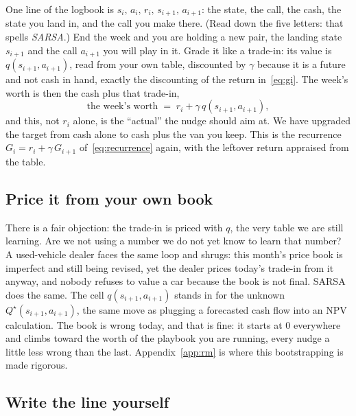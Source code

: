 \documentclass[11pt,a4paper]{article}
\theoremstyle{definition}
\theoremstyle{remark}
\numberwithin{equation}{section}
\begin{document}
One line of the logbook is $s_i,\, a_i,\, r_i,\, s_{i+1},\, a_{i+1}$: the state, the call, the
cash, the state you land in, and the call you make there. (Read down the five letters: that
spells \emph{SARSA}.) End the week and you are holding a new pair, the landing state
$s_{i+1}$ and the call $a_{i+1}$ you will play in it. Grade it like a trade-in: its value is
$q(s_{i+1}, a_{i+1})$, read from your own table, discounted by $\gamma$ because it is a future
and not cash in hand, exactly the discounting of the return in~\eqref{eq:gi}. The week's worth
is then the cash plus that trade-in,
\[
\text{the week's worth} \;=\; r_i + \gamma\, q(s_{i+1}, a_{i+1}),
\]
and this, not $r_i$ alone, is the ``actual'' the nudge should aim at. We have upgraded the
target from cash alone to cash plus the van you keep. This is the recurrence
$G_i = r_i + \gamma\, G_{i+1}$ of~\eqref{eq:recurrence} again, with the leftover return
appraised from the table.

\subsection*{Price it from your own book}

There is a fair objection: the trade-in is priced with $q$, the very table we are still
learning. Are we not using a number we do not yet know to learn that number? A used-vehicle
dealer faces the same loop and shrugs: this month's price book is imperfect and still being
revised, yet the dealer prices today's trade-in from it anyway, and nobody refuses to value a
car because the book is not final. SARSA does the same. The cell $q(s_{i+1}, a_{i+1})$ stands
in for the unknown $Q^\star(s_{i+1}, a_{i+1})$, the same move as plugging a forecasted cash
flow into an NPV calculation. The book is wrong today, and that is fine: it starts at $0$
everywhere and climbs toward the worth of the playbook you are running, every nudge a little
less wrong than the last. Appendix~\ref{app:rm} is where this bootstrapping is made rigorous.

\subsection*{Write the line yourself}
\end{document}
